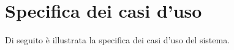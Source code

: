 \section{Specifica dei casi d'uso}

Di seguito \`e illustrata la specifica dei casi d'uso del sistema.



